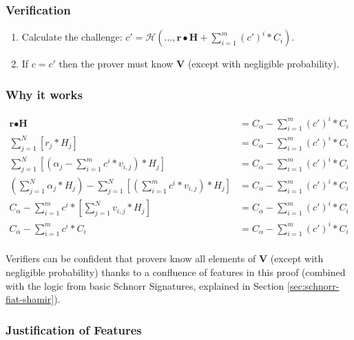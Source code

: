 \subsubsection*{Verification}

\begin{enumerate}
	\item Calculate the challenge: \(c' = \mathcal{H}(...,\textbf{r} \bullet \textbf{H} + \sum^{m}_{i=1} (c')^i*C_i)\).
	\item If $c = c'$ then the prover must know $\boldsymbol{V}$ (except with negligible probability).
\end{enumerate}

\subsubsection*{Why it works}

\begin{align*}
\textbf{r} \bullet \textbf{H} &= C_{\alpha} - \sum^{m}_{i=1} (c')^i*C_i \\
\sum^{N}_{j=1} [r_j*H_j] &= C_{\alpha} - \sum^{m}_{i=1} (c')^i*C_i \\
\sum^{N}_{j=1} [(\alpha_j - \sum^{m}_{i=1} c^i*v_{i,j})*H_j] &= C_{\alpha} - \sum^{m}_{i=1} (c')^i*C_i \\
(\sum^{N}_{j=1} \alpha_j*H_j) - \sum^{N}_{j=1} [(\sum^{m}_{i=1} c^i*v_{i,j})*H_j] &= C_{\alpha} - \sum^{m}_{i=1} (c')^i*C_i \\
C_{\alpha} - \sum^{m}_{i=1} c^i*[\sum^{N}_{j=1} v_{i,j}*H_j] &= C_{\alpha} - \sum^{m}_{i=1} (c')^i*C_i \\
C_{\alpha} - \sum^{m}_{i=1} c^i*C_i &= C_{\alpha} - \sum^{m}_{i=1} (c')^i*C_i \\
\end{align*}

Verifiers can be confident that provers know all elements of $\boldsymbol{V}$ (except with negligible probability) thanks to a confluence of features in this proof (combined with the logic from basic Schnorr Signatures, explained in Section \ref{sec:schnorr-fiat-shamir}).%

\subsubsection*{Justification of Features}

